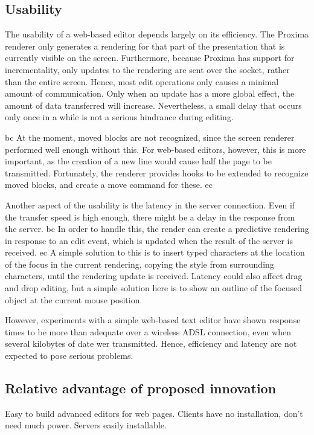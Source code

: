 \documentclass[10pt]{article}
\begin{document}
\bc
\subsection{Usability}

The usability of a web-based editor depends largely on its efficiency. The Proxima renderer only generates a rendering for that part of the presentation that is currently visible on the screen. Furthermore, because Proxima has support for incrementality, only updates to the rendering are sent over the socket, rather than the entire screen. Hence, most edit operations only causes a minimal amount of communication. Only when an update has a more global effect, the amount of data transferred will increase. Nevertheless, a small delay that occurs only once in a while is not a serious hindrance during editing. 

bc
At the moment, moved blocks are not recognized, since the screen renderer performed well enough without this. For web-based editors, however, this is more important, as the creation of a new line would cause half the page to be transmitted. Fortunately, the renderer provides hooks to be extended to recognize moved blocks, and create a move command for these.
ec

Another aspect of the usability is the latency in the server connection. Even if the transfer speed is high enough, there might be a delay in the response from the server. bc 
In order to handle this, the render can create a predictive rendering in response to an edit event, which is updated when the result of the server is received.
ec
A simple solution to this is to insert typed characters at the location of the focus in the current rendering, copying the style from surrounding characters, until the rendering update is received. Latency could also affect drag and drop editing, but a simple solution here is to show an outline of the focused object at the current mouse position. 

However, experiments with a simple web-based text editor have shown response times to be more than adequate over a wireless ADSL connection, even when several kilobytes of date wer transmitted. Hence, efficiency and latency are not expected to pose serious problems. 
\ec

\subsection{Relative advantage of proposed innovation}

Easy to build advanced editors for web pages. Clients have no installation, don't need much power. Servers easily installable.
\end{document}
